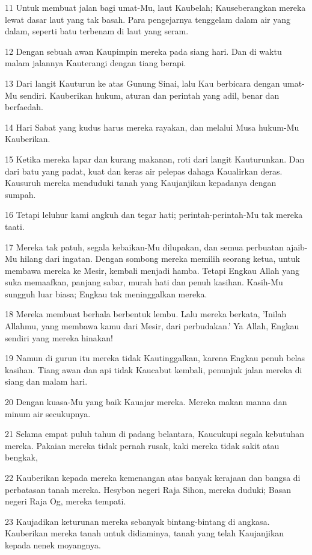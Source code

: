 \par 11 Untuk membuat jalan bagi umat-Mu, laut Kaubelah; Kauseberangkan mereka lewat dasar laut yang tak basah. Para pengejarnya tenggelam dalam air yang dalam, seperti batu terbenam di laut yang seram.
\par 12 Dengan sebuah awan Kaupimpin mereka pada siang hari. Dan di waktu malam jalannya Kauterangi dengan tiang berapi.
\par 13 Dari langit Kauturun ke atas Gunung Sinai, lalu Kau berbicara dengan umat-Mu sendiri. Kauberikan hukum, aturan dan perintah yang adil, benar dan berfaedah.
\par 14 Hari Sabat yang kudus harus mereka rayakan, dan melalui Musa hukum-Mu Kauberikan.
\par 15 Ketika mereka lapar dan kurang makanan, roti dari langit Kauturunkan. Dan dari batu yang padat, kuat dan keras air pelepas dahaga Kaualirkan deras. Kausuruh mereka menduduki tanah yang Kaujanjikan kepadanya dengan sumpah.
\par 16 Tetapi leluhur kami angkuh dan tegar hati; perintah-perintah-Mu tak mereka taati.
\par 17 Mereka tak patuh, segala kebaikan-Mu dilupakan, dan semua perbuatan ajaib-Mu hilang dari ingatan. Dengan sombong mereka memilih seorang ketua, untuk membawa mereka ke Mesir, kembali menjadi hamba. Tetapi Engkau Allah yang suka memaafkan, panjang sabar, murah hati dan penuh kasihan. Kasih-Mu sungguh luar biasa; Engkau tak meninggalkan mereka.
\par 18 Mereka membuat berhala berbentuk lembu. Lalu mereka berkata, 'Inilah Allahmu, yang membawa kamu dari Mesir, dari perbudakan.' Ya Allah, Engkau sendiri yang mereka hinakan!
\par 19 Namun di gurun itu mereka tidak Kautinggalkan, karena Engkau penuh belas kasihan. Tiang awan dan api tidak Kaucabut kembali, penunjuk jalan mereka di siang dan malam hari.
\par 20 Dengan kuasa-Mu yang baik Kauajar mereka. Mereka makan manna dan minum air secukupnya.
\par 21 Selama empat puluh tahun di padang belantara, Kaucukupi segala kebutuhan mereka. Pakaian mereka tidak pernah rusak, kaki mereka tidak sakit atau bengkak,
\par 22 Kauberikan kepada mereka kemenangan atas banyak kerajaan dan bangsa di perbatasan tanah mereka. Hesybon negeri Raja Sihon, mereka duduki; Basan negeri Raja Og, mereka tempati.
\par 23 Kaujadikan keturunan mereka sebanyak bintang-bintang di angkasa. Kauberikan mereka tanah untuk didiaminya, tanah yang telah Kaujanjikan kepada nenek moyangnya.
